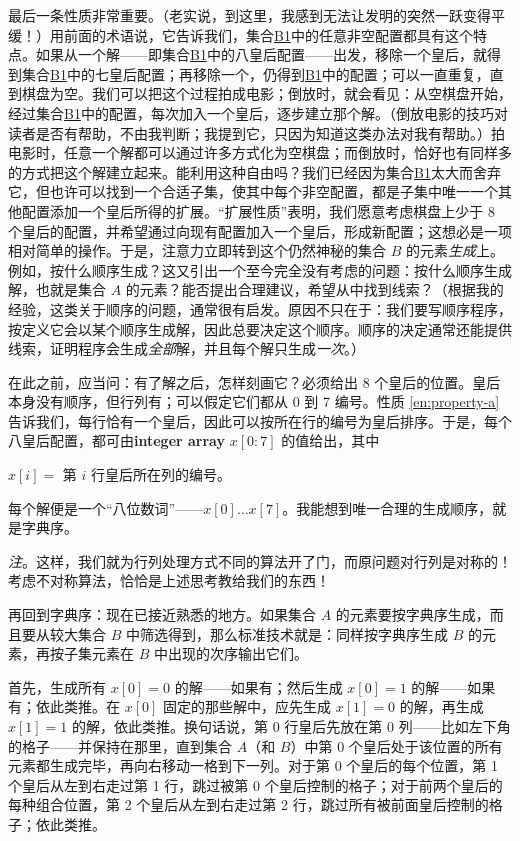\documentclass[twoside,11pt,fontset=none]{ctexbook}
\begin{document}
最后一条性质非常重要。（老实说，到这里，我感到无法让发明的突然一跃变得平缓！）用前面的术语说，它告诉我们，集合\hyperref[en:b1-eight-queens]{B1}中的任意非空配置都具有这个特点。如果从一个解——即集合\hyperref[en:b1-eight-queens]{B1}中的八皇后配置——出发，移除一个皇后，就得到集合\hyperref[en:b1-eight-queens]{B1}中的七皇后配置；再移除一个，仍得到\hyperref[en:b1-eight-queens]{B1}中的配置；可以一直重复，直到棋盘为空。我们可以把这个过程拍成电影；倒放时，就会看见：从空棋盘开始，经过集合\hyperref[en:b1-eight-queens]{B1}中的配置，每次加入一个皇后，逐步建立那个解。（倒放电影的技巧对读者是否有帮助，不由我判断；我提到它，只因为知道这类办法对我有帮助。）拍电影时，任意一个解都可以通过许多方式化为空棋盘；而倒放时，恰好也有同样多的方式把这个解建立起来。能利用这种自由吗？我们已经因为集合\hyperref[en:b1-eight-queens]{B1}太大而舍弃它，但也许可以找到一个合适子集，使其中每个非空配置，都是子集中唯一一个其他配置添加一个皇后所得的扩展。“扩展性质”表明，我们愿意考虑棋盘上少于 8 个皇后的配置，并希望通过向现有配置加入一个皇后，形成新配置；这想必是一项相对简单的操作。于是，注意力立即转到这个仍然神秘的集合 $B$ 的元素\textit{生成}上。例如，按什么顺序生成？这又引出一个至今完全没有考虑的问题：按什么顺序生成解，也就是集合 $A$ 的元素？能否提出合理建议，希望从中找到线索？（根据我的经验，这类关于顺序的问题，通常很有启发。原因不只在于：我们要写顺序程序，按定义它会以某个顺序生成解，因此总要决定这个顺序。顺序的决定通常还能提供线索，证明程序会生成\textit{全部}解，并且每个解只生成\textit{一次}。）

在此之前，应当问：有了解之后，怎样刻画它？必须给出 8 个皇后的位置。皇后本身没有顺序，但行列有；可以假定它们都从 0 到 7 编号。性质 \ref{en:property-a} 告诉我们，每行恰有一个皇后，因此可以按所在行的编号为皇后排序。于是，每个八皇后配置，都可由\textbf{integer array} $x[0:7]$ 的值给出，其中

\noindent
$x[i] =$ 第 $i$ 行皇后所在列的编号。

每个解便是一个“八位数词”——$x[0] \dots x[7]$。我能想到唯一合理的生成顺序，就是字典序。

\noindent
\textit{注}。这样，我们就为行列处理方式不同的算法开了门，而原问题对行列是对称的！考虑不对称算法，恰恰是上述思考教给我们的东西！

再回到字典序：现在已接近熟悉的地方。如果集合 $A$ 的元素要按字典序生成，而且要从较大集合 $B$ 中筛选得到，那么标准技术就是：同样按字典序生成 $B$ 的元素，再按子集元素在 $B$ 中出现的次序输出它们。

首先，生成所有 $x[0] = 0$ 的解——如果有；然后生成 $x[0] = 1$ 的解——如果有；依此类推。在 $x[0]$ 固定的那些解中，应先生成 $x[1] = 0$ 的解，再生成 $x[1] = 1$ 的解，依此类推。换句话说，第 0 行皇后先放在第 0 列——比如左下角的格子——并保持在那里，直到集合 $A$（和 $B$）中第 0 个皇后处于该位置的所有元素都生成完毕，再向右移动一格到下一列。对于第 0 个皇后的每个位置，第 1 个皇后从左到右走过第 1 行，跳过被第 0 个皇后控制的格子；对于前两个皇后的每种组合位置，第 2 个皇后从左到右走过第 2 行，跳过所有被前面皇后控制的格子；依此类推。
\end{document}
